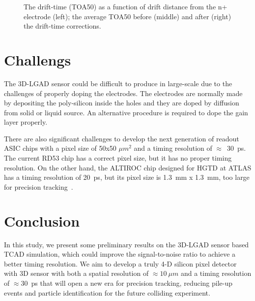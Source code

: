 \documentclass[aps,pt14,superscriptaddress,showpacs,floatfix,nofootinbib]{revtex4}
\begin{document}
\begin{figure}[hbtp]
\begin{center}
\caption{The drift-time (TOA50) as a function of drift distance from the n+ electrode (left); the average TOA50 before (middle) and 
after (right) the drift-time corrections.~\label{fig:kdettoa}}
\end{center}
\end{figure}

\section{Challengs} 

The 3D-LGAD sensor could be difficult to
produce in large-scale due to the challenges of properly doping the electrodes.
The electrodes are normally made by depositing the poly-silicon inside the holes and
they are doped by diffusion from solid or liquid source.
An alternative procedure is required to dope the gain layer properly. 

There are also significant challenges to develop the next generation of readout ASIC chips with
a pixel size of 50x50 $\mu m^2$ and a timing resolution of $\approx$~30~ps.
The current RD53 chip has a correct pixel size, but it has no proper
timing resolution. On the other hand, the ALTIROC chip designed for HGTD at ATLAS has
a timing resolution of 20~ps, but its pixel size is 1.3~mm x 1.3~mm,
too large for precision tracking~\cite{delaTaille:2018qap}.

\section{Conclusion}

In this study, we present some preliminary results on the 3D-LGAD sensor based TCAD simulation, which
could improve the signal-to-noise ratio to achieve a better timing resolution.
We aim to develop a truly 4-D silicon pixel detector with 3D sensor with both a spatial
resolution of $\approx 10~\mu m$ and a timing resolution of $\approx$30~ps
that  will open a new era for precision tracking, reducing pile-up
events and particle identification for the future colliding experiment.


\def\bibname{\Large\bf References}
\def\refname{\Large\bf References}
\pagestyle{plain}

\end{document}
